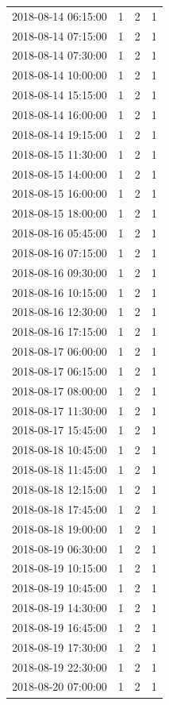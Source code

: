 \begin{tabular}{lrrr}
2018-08-14 06:15:00 & 1 & 2 & 1 \\
2018-08-14 07:15:00 & 1 & 2 & 1 \\
2018-08-14 07:30:00 & 1 & 2 & 1 \\
2018-08-14 10:00:00 & 1 & 2 & 1 \\
2018-08-14 15:15:00 & 1 & 2 & 1 \\
2018-08-14 16:00:00 & 1 & 2 & 1 \\
2018-08-14 19:15:00 & 1 & 2 & 1 \\
2018-08-15 11:30:00 & 1 & 2 & 1 \\
2018-08-15 14:00:00 & 1 & 2 & 1 \\
2018-08-15 16:00:00 & 1 & 2 & 1 \\
2018-08-15 18:00:00 & 1 & 2 & 1 \\
2018-08-16 05:45:00 & 1 & 2 & 1 \\
2018-08-16 07:15:00 & 1 & 2 & 1 \\
2018-08-16 09:30:00 & 1 & 2 & 1 \\
2018-08-16 10:15:00 & 1 & 2 & 1 \\
2018-08-16 12:30:00 & 1 & 2 & 1 \\
2018-08-16 17:15:00 & 1 & 2 & 1 \\
2018-08-17 06:00:00 & 1 & 2 & 1 \\
2018-08-17 06:15:00 & 1 & 2 & 1 \\
2018-08-17 08:00:00 & 1 & 2 & 1 \\
2018-08-17 11:30:00 & 1 & 2 & 1 \\
2018-08-17 15:45:00 & 1 & 2 & 1 \\
2018-08-18 10:45:00 & 1 & 2 & 1 \\
2018-08-18 11:45:00 & 1 & 2 & 1 \\
2018-08-18 12:15:00 & 1 & 2 & 1 \\
2018-08-18 17:45:00 & 1 & 2 & 1 \\
2018-08-18 19:00:00 & 1 & 2 & 1 \\
2018-08-19 06:30:00 & 1 & 2 & 1 \\
2018-08-19 10:15:00 & 1 & 2 & 1 \\
2018-08-19 10:45:00 & 1 & 2 & 1 \\
2018-08-19 14:30:00 & 1 & 2 & 1 \\
2018-08-19 16:45:00 & 1 & 2 & 1 \\
2018-08-19 17:30:00 & 1 & 2 & 1 \\
2018-08-19 22:30:00 & 1 & 2 & 1 \\
2018-08-20 07:00:00 & 1 & 2 & 1 \\

\end{tabular}
